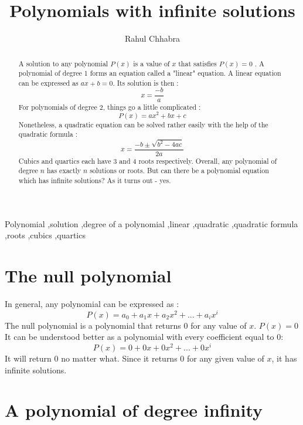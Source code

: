 \documentclass[preprint,12pt]{elsarticle}
\begin{document}
\begin{frontmatter}
\title{Polynomials with infinite solutions}
\author{Rahul Chhabra}
\address{St. Joseph's College, Prayagraj, Uttar Pradesh, India}
\begin{abstract}
A solution to any polynomial $P(x)$ is a value of $x$ that satisfies $P(x) = 0$ . A polynomial of degree 1 forms an equation called a "linear" equation. A linear equation can be expressed as $ax + b = 0$. Its solution is then : 
\[
    x = \frac{-b}{a}
\]
For polynomials of degree 2, things go a little complicated :
\[
    P(x) = ax^2 + bx + c
\]
Nonetheless, a quadratic equation can be solved rather easily with the help of the quadratic formula :
\[
    x = \frac{-b \pm \sqrt{b^2 - 4ac}}{2a} 
\]
Cubics and quartics each have 3 and 4 roots respectively.
Overall, any polynomial of degree $n$ has exactly $n$ solutions or roots. 
But can there be a polynomial equation which has infinite solutions?
As it turns out - yes.
\end{abstract}

\begin{keyword}
Polynomial \sep solution \sep degree of a polynomial \sep linear 
\sep quadratic \sep quadratic formula \sep roots \sep cubics \sep quartics


\end{keyword}

\end{frontmatter}


\section{The null polynomial}
In general, any polynomial can be expressed as :
\[
    P(x) = a_0 + a_1x + a_2x^2 + ...  + a_ix^i
\]
The null polynomial is a polynomial that returns 0 for any value of $x$.
$P(x) = 0$
It can be understood better as a polynomial with every coefficient equal to 0:
\[
    P(x) = 0 + 0x + 0x^2 + ... + 0x^i
\]
It will return 0 no matter what. Since it returns 0 for any given value of $x$, it has infinite solutions.\cite{1137202}
\label{S:1}

\section{A polynomial of degree infinity}
\end{document}
